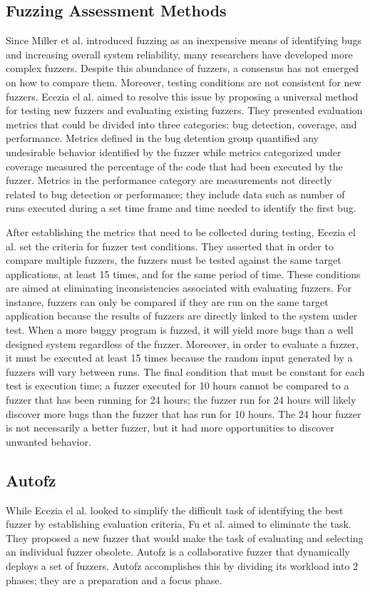 \subsection{Fuzzing Assessment Methods}
Since Miller et al. introduced fuzzing as an inexpensive means of identifying bugs and increasing overall system reliability, many researchers have developed more complex fuzzers. Despite this abundance of fuzzers, a consensus has not emerged on how to compare them. Moreover, testing conditions are not consistent for new fuzzers. Ecezia el al. aimed to resolve this issue by proposing a universal method for testing new fuzzers and evaluating existing fuzzers. They presented evaluation metrics that could be divided into three categories: bug detection, coverage, and performance. Metrics defined in the bug detention group quantified any undesirable behavior identified by the fuzzer while metrics categorized under coverage measured the percentage of the code that had been executed by the fuzzer. Metrics in the performance category are measurements not directly related to bug detection or performance; they include data such as number of runs executed during a set time frame and time needed to identify the first bug.

After establishing the metrics that need to be collected during testing, Ecezia el al. set the criteria for fuzzer test conditions. They asserted that in order to compare multiple fuzzers, the fuzzers must be tested against the same target applications, at least 15 times, and for the same period of time. These conditions are aimed at eliminating inconsistencies associated with evaluating fuzzers. For instance, fuzzers can only be compared if they are run on the same target application because the results of fuzzers are directly linked to the system under test. When a more buggy program is fuzzed, it will yield more bugs than a well designed system regardless of the fuzzer. Moreover, in order to evaluate a fuzzer, it must be executed at least 15 times because the random input generated by a fuzzers will vary between runs. The final condition that must be constant for each test is execution time; a fuzzer executed for 10 hours cannot be compared to a fuzzer that has been running for 24 hours; the fuzzer run for 24 hours will likely discover more bugs than the fuzzer that has run for 10 hours. The 24 hour fuzzer is not necessarily a better fuzzer, but it had more opportunities to discover unwanted behavior. \cite{Ecezia}

\subsection{Autofz}
While Ecezia el al. looked to simplify the difficult task of identifying the best fuzzer by establishing evaluation criteria, Fu et al. aimed to eliminate the task. They proposed a new fuzzer that would make the task of evaluating and selecting an individual fuzzer obsolete. Autofz is a collaborative fuzzer that dynamically deploys a set of fuzzers. Autofz accomplishes this by dividing its workload into 2 phases; they are a preparation and a focus phase. 

